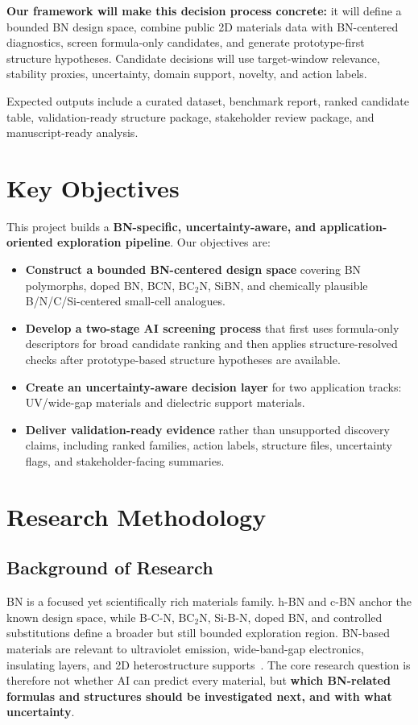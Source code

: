 \documentclass[10pt,a4paper]{article}
\begin{document}
\textbf{Our framework will make this decision process concrete:} it will define a bounded BN design space, combine public 2D materials data with BN-centered diagnostics, screen formula-only candidates, and generate prototype-first structure hypotheses. Candidate decisions will use target-window relevance, stability proxies, uncertainty, domain support, novelty, and action labels.

Expected outputs include a curated dataset, benchmark report, ranked candidate table, validation-ready structure package, stakeholder review package, and manuscript-ready analysis.

\vspace{-10pt}
\section{Key Objectives}
\vspace{-5pt}
This project builds a \textbf{BN-specific, uncertainty-aware, and application-oriented exploration pipeline}. Our objectives are:
\begin{itemize}[leftmargin=*]
    \item \textbf{Construct a bounded BN-centered design space} covering BN polymorphs, doped BN, BCN, BC$_2$N, SiBN, and chemically plausible B/N/C/Si-centered small-cell analogues.
    \item \textbf{Develop a two-stage AI screening process} that first uses formula-only descriptors for broad candidate ranking and then applies structure-resolved checks after prototype-based structure hypotheses are available.
    \item \textbf{Create an uncertainty-aware decision layer} for two application tracks: UV/wide-gap materials and dielectric support materials.
    \item \textbf{Deliver validation-ready evidence} rather than unsupported discovery claims, including ranked families, action labels, structure files, uncertainty flags, and stakeholder-facing summaries.
\end{itemize}

\vspace{-10pt}
\section{Research Methodology}
\vspace{-5pt}
\subsection{Background of Research}
BN is a focused yet scientifically rich materials family. h-BN and c-BN anchor the known design space, while B-C-N, BC$_2$N, Si-B-N, doped BN, and controlled substitutions define a broader but still bounded exploration region. BN-based materials are relevant to ultraviolet emission, wide-band-gap electronics, insulating layers, and 2D heterostructure supports~\cite{watanabe2004_hbn_uv,cassabois2016_hbn_indirect,dean2010_hbn_graphene}. The core research question is therefore not whether AI can predict every material, but \textbf{which BN-related formulas and structures should be investigated next, and with what uncertainty}.
\end{document}
